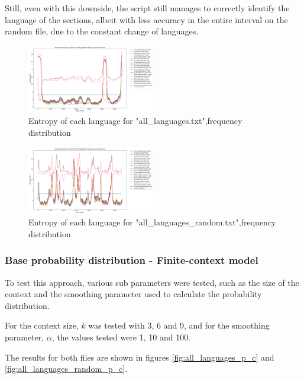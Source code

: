 \documentclass{article}
\begin{document}
Still, even with this downside, the script still manages to correctly identify the language of the sections, albeit with less accuracy in the entire interval on the random file,
due to the constant change of languages.

\begin{figure}
    \centering
    \includegraphics[width=0.5\textwidth]{../results/all_languages/-p_f.png}
    \caption{Entropy of each language for "all_languages.txt",frequency distribution}
    \label{fig:all_languages_p_f}
\end{figure}

\begin{figure}
    \centering
    \includegraphics[width=0.5\textwidth]{../results/all_languages_random/-p_f.png}
    \caption{Entropy of each language for "all_languages_random.txt",frequency distribution}
    \label{fig:all_languages_random_p_f}
\end{figure}

\subsubsection{Base probability distribution - Finite-context model}
\label{subsubsec:results_locate_lang_first_order_fcm}

To test this approach, various sub parameters were tested, such as the size of the context and the smoothing parameter used to calculate the probability distribution.

For the context size, $k$ was tested with 3, 6 and 9, and for the smoothing parameter, $\alpha$, the values tested were 1, 10 and 100.

The results for both files are shown in figures \ref{fig:all_languages_p_c} and \ref{fig:all_languages_random_p_c}.
\end{document}
